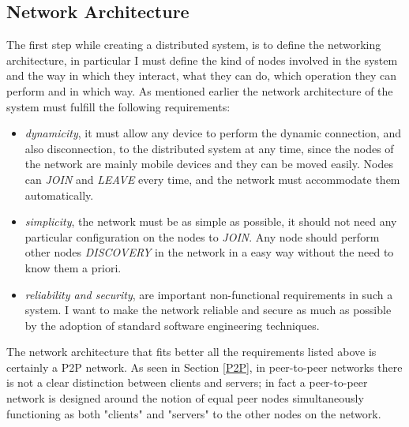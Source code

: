 \subsection{Network Architecture}
The first step while creating a distributed system, is to define the networking architecture, in particular I must define the kind of nodes involved in the system and the way in which they interact, what they can do, which operation they can perform and in which way. As mentioned earlier the network architecture of the system must fulfill the following requirements:
\begin{itemize}
 \item \textit{dynamicity}, it must allow any device to perform the dynamic connection, and also disconnection, to the distributed system at any time, since the nodes of the network are mainly mobile devices and they can be moved easily. Nodes can \textit{JOIN} and \textit{LEAVE} every time, and the network must accommodate them automatically.
  \item \textit{simplicity}, the network must be as simple as possible, it should not need any particular configuration on the nodes to \textit{JOIN}. Any node should perform other nodes \textit{DISCOVERY} in the network in a easy way without the need to know them a priori.
 \item \textit{reliability and security}, are important non-functional requirements in such a system. I want to make the network reliable and secure as much as possible by the adoption of standard software engineering techniques.
\end{itemize}
The network architecture that fits better all the requirements listed above is certainly a P2P network. As seen in Section \ref{P2P}, in peer-to-peer networks there is not a clear distinction between clients and servers; in fact a peer-to-peer network is designed around the notion of equal peer nodes simultaneously functioning as both "clients" and "servers" to the other nodes on the network.

